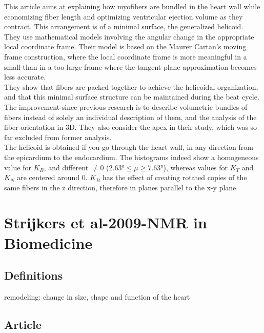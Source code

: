 This article aims at explaining how myofibers are bundled in the heart wall while economizing fiber length and optimizing ventricular ejection volume as they contract. This arrangement is of a minimal surface, the generalized helicoid.\\
They use mathematical models involving the angular change in the appropriate local coordinate frame. Their model is based on the Maurer Cartan's moving frame construction, where the local coordinate frame is more meaningful in a small than in a too large frame where the tangent plane approximation becomes less accurate.\\
They show that fibers are packed together to achieve the helicoidal organization, and that this minimal surface structure can be maintained during the beat cycle. The improvement since previous research is to describe volumetric bundles of fibers instead of solely an individual description of them, and the analysis of the fiber orientation in 3D. They also consider the apex in their study, which was so far excluded from former analysis.\\
The helicoid is obtained if you go through the heart wall, in any direction from the epicardium to the endocardium. The histograms indeed show a homogeneous value for $K_B$, and different $\neq 0$ ($2.63° \leq \mu \geq 7.63°$), whereas values for $K_T$ and $K_N$ are centered around 0. $K_B$ has the effect of creating rotated copies of the same fibers in the z direction, therefore in planes parallel to the x-y plane.

\section{Strijkers et al-2009-NMR in Biomedicine}

\subsection{Definitions}

remodeling: change in size, shape and function of the heart

\subsection{Article}

